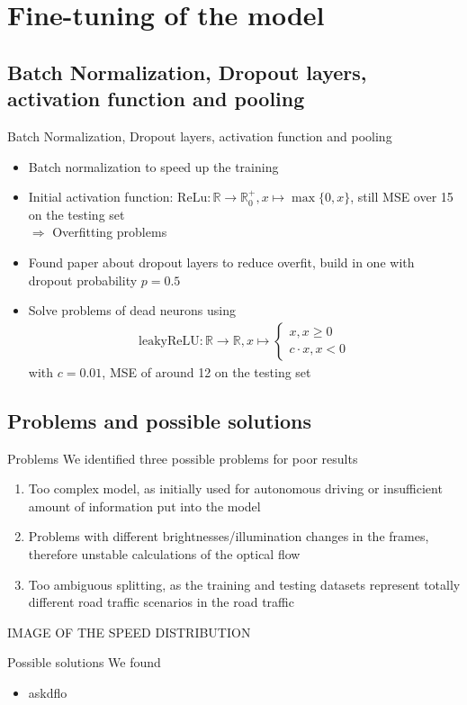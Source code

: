 \section{Fine-tuning of the model}
\subsection{Batch Normalization, Dropout layers, activation function and pooling}

\begin{frame}{Batch Normalization, Dropout layers, activation function and pooling}
\begin{itemize}
\item Batch normalization to speed up the training \cite{BatchNorm2015}
\item Initial activation function: $\mathrm{ReLu}: \mathbb{R} \to \mathbb{R}_0^+, x \mapsto \max\{0,x\}$, still MSE over 15 on the testing set\\
$\Rightarrow$ Overfitting problems
\item Found paper about dropout layers \cite{Dropout2014} to reduce overfit, build in one with dropout probability $p=0.5$
\item Solve problems of dead neurons using
\begin{align*}
\mathrm{leakyReLU} : \mathbb{R} \to \mathbb{R}, x \mapsto \begin{cases}
x, x \geq 0\\
c \cdot x, x <0
\end{cases}
\end{align*}
with $c = 0.01$, MSE of around 12 on the testing set
\end{itemize}
\end{frame}
\subsection{Problems and possible solutions}
\begin{frame}{Problems}
We identified three possible problems for poor results
\begin{enumerate}
\item Too complex model, as initially used for autonomous driving or insufficient amount of information put into the model
\item Problems with different brightnesses/illumination changes in the frames, therefore unstable calculations of the optical flow
\item Too ambiguous splitting, as the training and testing datasets represent totally different road traffic scenarios in the road 
traffic
\end{enumerate}
IMAGE OF THE SPEED DISTRIBUTION
\end{frame}
\begin{frame}{Possible solutions}
We found
\begin{itemize}
\item askdflo
\end{itemize}
\end{frame}
